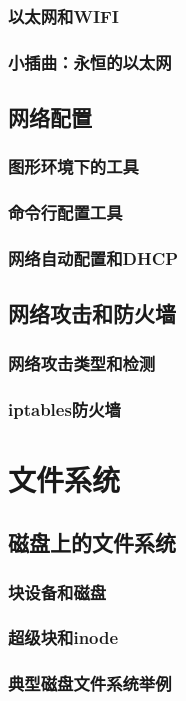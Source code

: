 \documentclass[amstex]{ctexbook}
\begin{document}
\subsection{ 以太网和WIFI}
\subsection*{  小插曲：永恒的以太网}
\section{  网络配置}
\subsection{  图形环境下的工具	}
\subsection{ 命令行配置工具}
\subsection{ 网络自动配置和DHCP}
\section{  网络攻击和防火墙	}
\subsection{ 网络攻击类型和检测}
\subsection{  iptables防火墙}

\chapter{文件系统}
\section{  磁盘上的文件系统	}
\subsection{  块设备和磁盘}
\subsection{ 超级块和inode}
\subsection{  典型磁盘文件系统举例}
\end{document}
